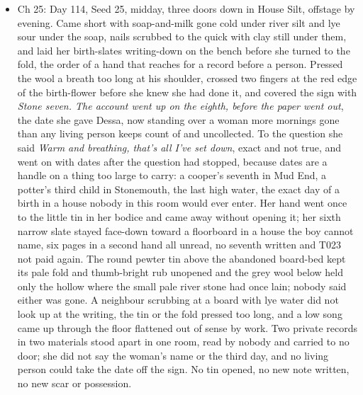 \documentclass{design/chronicle}
\begin{document}
{\begin{itemize}[leftmargin=1.4em,itemsep=1pt,topsep=3pt,parsep=0pt]
\item Ch 25: Day 114, Seed 25, midday, three doors down in House Silt, offstage by evening. Came short with soap-and-milk gone cold under river silt and lye sour under the soap, nails scrubbed to the quick with clay still under them, and laid her birth-slates writing-down on the bench before she turned to the fold, the order of a hand that reaches for a record before a person. Pressed the wool a breath too long at his shoulder, crossed two fingers at the red edge of the birth-flower before she knew she had done it, and covered the sign with \emph{Stone seven. The account went up on the eighth, before the paper went out}, the date she gave Dessa, now standing over a woman more mornings gone than any living person keeps count of and uncollected. To the question she said \emph{Warm and breathing, that’s all I’ve set down}, exact and not true, and went on with dates after the question had stopped, because dates are a handle on a thing too large to carry: a cooper’s seventh in Mud End, a potter’s third child in Stonemouth, the last high water, the exact day of a birth in a house nobody in this room would ever enter. Her hand went once to the little tin in her bodice and came away without opening it; her sixth narrow slate stayed face-down toward a floorboard in a house the boy cannot name, six pages in a second hand all unread, no seventh written and T023 not paid again. The round pewter tin above the abandoned board-bed kept its pale fold and thumb-bright rub unopened and the grey wool below held only the hollow where the small pale river stone had once lain; nobody said either was gone. A neighbour scrubbing at a board with lye water did not look up at the writing, the tin or the fold pressed too long, and a low song came up through the floor flattened out of sense by work. Two private records in two materials stood apart in one room, read by nobody and carried to no door; she did not say the woman’s name or the third day, and no living person could take the date off the sign. No tin opened, no new note written, no new scar or possession.

\end{itemize}

\begin{itemize}[leftmargin=1.4em,itemsep=1pt,topsep=3pt,parsep=0pt]


\end{itemize}}
\end{document}
